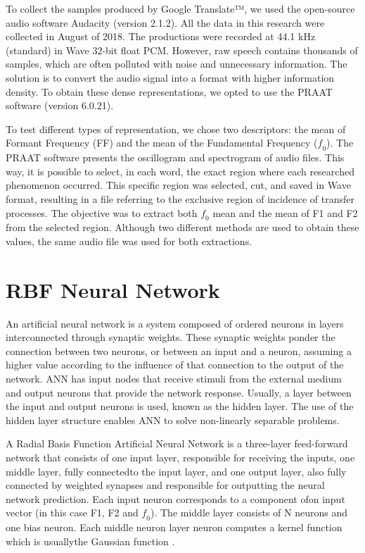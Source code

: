 To collect the samples produced by Google Translate™, we used the open-source
audio software Audacity (version 2.1.2). All the data in this research were
collected in August of 2018. The productions were recorded at 44.1 kHz
(standard) in Wave 32-bit float PCM. However, raw speech contains thousands of
samples, which are often polluted with noise and unnecessary information. The
solution is to convert the audio signal into a format with higher information
density. To obtain these dense representations, we opted to use the PRAAT
software (version 6.0.21).

To test different types of representation, we chose two descriptors: the mean
of Formant Frequency (FF) and the mean of the Fundamental Frequency
($\textit{f}_0$). The PRAAT software presents the oscillogram and spectrogram
of audio files. This way, it is possible to select, in each word, the exact
region where each researched phenomenon occurred. This specific region was
selected, cut, and saved in Wave format, resulting in a file referring to the
exclusive region of incidence of transfer processes. The objective was to
extract both $\textit{f}_0$ mean and the mean of F1 and F2 from the selected
region. Although two different methods are used to obtain these values, the
same audio file was used for both extractions.

\section{RBF Neural Network}
An artificial neural network is a system composed of ordered neurons in layers
interconnected through synaptic weights. These synaptic weights ponder the
connection between two neurons, or between an input and a neuron, assuming a
higher value according to the influence of that connection to the output of the
network. ANN has input nodes that receive stimuli from the external medium and
output neurons that provide the network response. Usually, a layer between the
input and output neurons is used, known as the hidden layer. The use of the
hidden layer structure enables ANN to solve non-linearly separable problems.

A Radial Basis Function Artificial Neural Network is a three-layer feed-forward
network that consists of one input layer, responsible for receiving the inputs,
one middle layer, fully connectedto the input layer, and one output layer, also
fully connected by weighted synapses and responsible for outputting the neural
network prediction. Each input neuron corresponds to a component ofon input
vector (in this case F1, F2 and $\textit{f}_0$). The middle layer consists of N
neurons and one bias neuron. Each middle neuron layer neuron computes a kernel
function which is usuallythe Gaussian function \citep{HWANG19971495}.


